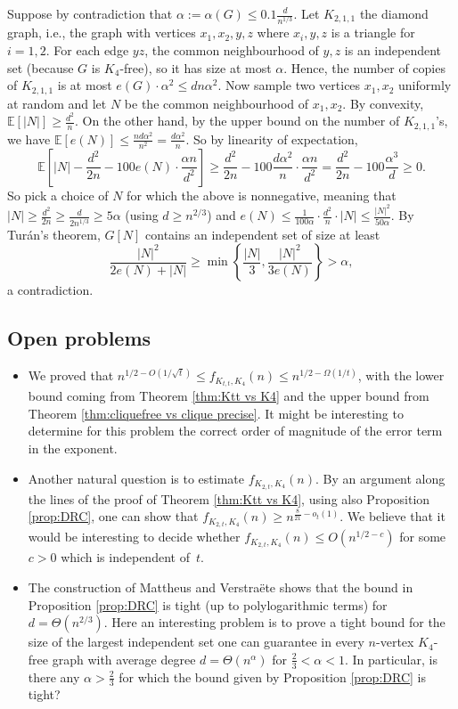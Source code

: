\documentclass[11pt]{article}
\let\oldendproof\endproof
\renewenvironment{proof}[1][\proofname]{\oldproof[\bf #1]}{\oldendproof}
\theoremstyle{plain}
\theoremstyle{definition}
\begin{document}
\begin{proof}[Proof of Proposition \ref{prop:DRC}]
Suppose by contradiction that $\alpha := \alpha(G) \leq 0.1\frac{d}{n^{1/3}}$.
Let $K_{2,1,1}$ the diamond graph, i.e., the graph with vertices $x_1,x_2,y,z$ where $x_i,y,z$ is a triangle for $i=1,2$.
For each edge $yz$, the common neighbourhood of $y,z$ is an independent set (because $G$ is $K_4$-free), so it has size at most $\alpha$. Hence, the number of copies of $K_{2,1,1}$ is at most $e(G) \cdot \alpha^2 \leq dn\alpha^2$. Now sample two vertices $x_1,x_2$ uniformly at random and let $N$ be the common neighbourhood of $x_1,x_2$. By convexity, 
$\mathbb{E}[|N|] \geq \frac{d^2}{n}$. On the other hand, by the upper bound on the number of $K_{2,1,1}$'s, we have $\mathbb{E}[e(N)] \leq \frac{nd\alpha^2}{n^2} = \frac{d\alpha^2}{n}$. So by linearity of expectation,
$$
\mathbb{E}\left[ |N| - \frac{d^2}{2n} - 100e(N) \cdot \frac{\alpha n}{d^2} \right] \geq \frac{d^2}{2n} - 100\frac{d\alpha^2}{n} \cdot \frac{\alpha n}{d^2} = \frac{d^2}{2n} - 100\frac{\alpha^3}{d} \geq 0.
$$
So pick a choice of $N$ for which the above is nonnegative, meaning that $|N| \geq \frac{d^2}{2n} \geq \frac{d}{2n^{1/3}} \geq 5\alpha$ (using $d \geq n^{2/3}$) and $e(N) \leq \frac{1}{100\alpha} \cdot \frac{d^2}{n} \cdot |N| \leq \frac{|N|^2}{50\alpha}$. 
By Tur\'an's theorem, $G[N]$ contains an independent set of size at least 
$$
\frac{|N|^2}{2e(N) + |N|} \geq \min\left\{\frac{|N|}{3},\frac{|N|^2}{3e(N)} \right\} > \alpha,$$ a contradiction.
\end{proof}

\subsection{Open problems}
\begin{itemize}
    \item We proved that $n^{1/2 - O(1/\sqrt{t})} \leq f_{K_{t,t},K_4}(n) \leq n^{1/2 - \Omega(1/t)}$, with the lower bound coming from Theorem \ref{thm:Ktt vs K4} and the upper bound from Theorem \ref{thm:cliquefree vs clique precise}. It might be interesting to determine for this problem the correct order of magnitude of the error term in the exponent. 
    \item Another natural question is to estimate $f_{K_{2,t},K_4}(n)$. By an argument along the lines of the proof of Theorem \ref{thm:Ktt vs K4}, using also Proposition \ref{prop:DRC}, one can show that $f_{K_{2,t},K_4}(n) \geq n^{\frac{8}{21}-o_t(1)}$. We believe that it would be interesting to decide whether
$f_{K_{2,t},K_4}(n) \leq O(n^{1/2 - c})$ for some $c > 0$ which is independent of~$t$.
    \item 
    The construction of Mattheus and Verstra\"ete \cite{Mattheus_Verstraete} shows that the bound in Proposition \ref{prop:DRC} is tight (up to polylogarithmic terms) for $d=\Theta(n^{2/3})$. Here an interesting problem is to prove a tight bound for the size of the largest independent set one can guarantee in every $n$-vertex $K_4$-free graph with average degree
    $d = \Theta(n^{\alpha})$ for $\frac{2}{3} < \alpha < 1$. In particular, is there any $\alpha > \frac{2}{3}$ for which the bound given by Proposition \ref{prop:DRC} is tight? 
\end{itemize}



\end{document}
